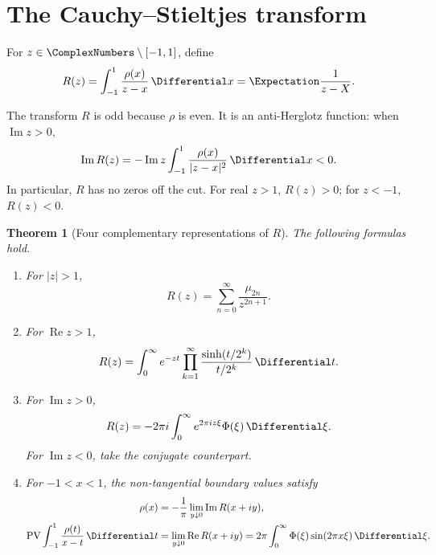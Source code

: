 \documentclass[11pt]{article}
\newtheorem{theorem}{Theorem}[section]
\theoremstyle{definition}
\theoremstyle{remark}
\newcommand{\PV}{\operatorname{PV}}
\begin{document}
\section{The Cauchy--Stieltjes transform}\label{p6:sec:cauchy}

\begin{definition}
For \(z\in\ComplexNumbers\setminus[-1,1]\), define
\begin{equation}
 R(z)=\int_{-1}^{1}\frac{\rho(x)}{z-x}\,\Differential x=\Expectation\frac1{z-X}. \label{p6:eq:R-def}
\end{equation}
\end{definition}

The transform \(R\) is odd because \(\rho\) is even.  It is an anti-Herglotz function:
when \(\operatorname{Im}z>0\),
\begin{equation}
 \operatorname{Im}R(z)
 =-\operatorname{Im}z\int_{-1}^{1}\frac{\rho(x)}{|z-x|^2}\,\Differential x<0. \label{p6:eq:R-anti-Herglotz}
\end{equation}
In particular, \(R\) has no zeros off the cut.  For real \(z>1\), \(R(z)>0\); for
\(z<-1\), \(R(z)<0\).

\begin{theorem}[Four complementary representations of \(R\)]\label{p6:thm:R-representations}
The following formulas hold.

\begin{enumerate}[label=(\roman*)]
\item For \(|z|>1\),
\begin{equation}
 R(z)=\sum_{n=0}^{\infty}\frac{\mu_{2n}}{z^{2n+1}}.          \label{p6:eq:R-moment}
\end{equation}
\item For \(\operatorname{Re}z>1\),
\begin{equation}
 R(z)=\int_0^{\infty}e^{-zt}
 \prod_{k=1}^{\infty}\frac{\sinh(t/2^k)}{t/2^k}\,\Differential t.    \label{p6:eq:R-Laplace}
\end{equation}
\item For \(\operatorname{Im}z>0\),
\begin{equation}
 R(z)=-2\pi i\int_0^{\infty}e^{2\pi i z\xi}\Phi(\xi)\,\Differential\xi. \label{p6:eq:R-Fourier-Laplace}
\end{equation}
For \(\operatorname{Im}z<0\), take the conjugate counterpart.
\item For \(-1<x<1\), the non-tangential boundary values satisfy
\begin{align}
 \rho(x)&=-\frac1\pi\lim_{y\downarrow0}\operatorname{Im}R(x+iy),
                                                               \label{p6:eq:R-boundary-density}\\
 \PV\int_{-1}^{1}\frac{\rho(t)}{x-t}\,\Differential t
 &=\lim_{y\downarrow0}\operatorname{Re}R(x+iy)
 =2\pi\int_0^{\infty}\Phi(\xi)\sin(2\pi x\xi)\,\Differential\xi.     \label{p6:eq:R-boundary-Hilbert}
\end{align}
\end{enumerate}
\end{theorem}
\end{document}
